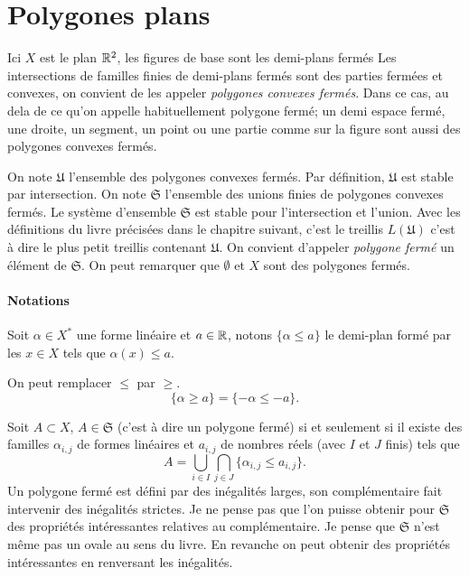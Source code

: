 \section{Polygones plans}\label{ExplePolyg}
Ici $X$ est le plan $\mathbb{R}^2$, les figures de base sont les demi-plans fermés Les intersections de familles finies de demi-plans fermés sont des parties fermées et convexes, on convient de les appeler \emph{polygones convexes fermés}. Dans ce cas, au dela de ce qu'on appelle habituellement polygone fermé; un demi espace fermé, une droite, un segment, un point ou une partie comme sur la figure sont aussi des polygones convexes fermés.

On  note $\mathfrak U$ l'ensemble des polygones convexes fermés. Par définition, $\mathfrak{U}$ est stable par intersection. On note $\mathfrak{S}$ l'ensemble des unions finies de polygones convexes fermés. Le système d'ensemble $\mathfrak{S}$ est stable pour l'intersection et l'union. Avec les définitions du livre précisées dans le chapitre suivant, c'est le treillis $L(\mathfrak U)$ c'est à dire le plus petit treillis contenant $\mathfrak{U}$.\newline
On convient d'appeler \emph{polygone fermé} un élément de $\mathfrak{S}$. On peut remarquer que $\emptyset$ et $X$ sont des polygones fermés.

\paragraph{Notations}
\label{sec:notpolygones}
Soit $\alpha \in X^*$ une forme linéaire et $a\in \mathbb{R}$, notons $\{ \alpha \leq a\}$ le demi-plan formé par les $x \in X$ tels que $\alpha(x) \leq a$.


\begin{rem} On peut remplacer $\leq$ par $\geq$.
 \begin{displaymath}
   \{ \alpha \geq a \} = \{ -\alpha \leq -a \}.
 \end{displaymath}
\end{rem}

Soit $A\subset X$, $A \in \mathfrak{S}$ (c'est à dire un polygone fermé) si et seulement si il existe des familles $\alpha_{i,j}$ de formes linéaires et $a_{i,j}$ de nombres réels (avec $I$ et $J$ finis) tels que
\begin{displaymath}
 A = \bigcup_{i \in I} \bigcap_{j \in J}\{ \alpha_{i,j} \leq a_{i,j}\}.
\end{displaymath}
Un polygone fermé est défini par des inégalités larges, son complémentaire fait intervenir des inégalités strictes. Je ne pense pas que l'on puisse obtenir pour $\mathfrak{S}$ des propriétés intéressantes relatives au complémentaire. Je pense que $\mathfrak{S}$ n'est même pas un ovale au sens du livre.\newline
En revanche on peut obtenir des propriétés intéressantes en renversant les inégalités.

